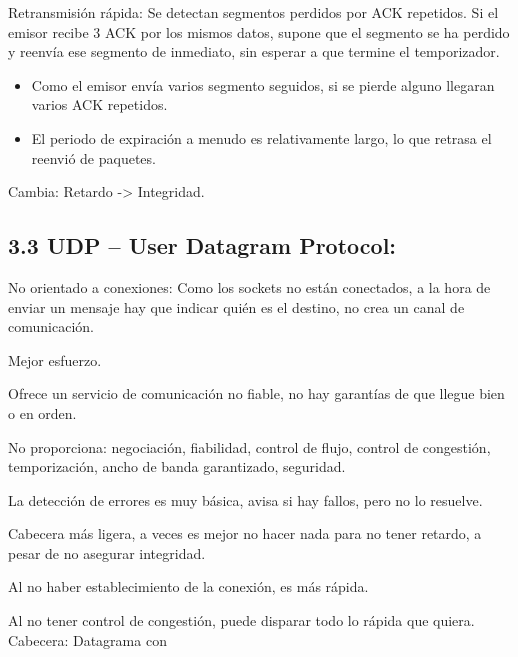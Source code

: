 \documentclass[12pt, twoside, openright]{report} %
\begin{document}
	Retransmisión rápida: Se detectan segmentos perdidos por ACK
    repetidos. Si el emisor recibe 3 ACK por los mismos datos, supone
    que el segmento se ha perdido y reenvía ese segmento de inmediato,
    sin esperar a que termine el temporizador.

    \begin{itemize}
    \item
      Como el emisor envía varios segmento seguidos, si se pierde alguno
      llegaran varios ACK repetidos.
    \item
      El periodo de expiración a menudo es relativamente largo, lo que
      retrasa el reenvió de paquetes.
    \end{itemize}

	Cambia: Retardo -\textgreater{} Integridad.

\subsection{3.3 UDP -- User Datagram Protocol:}


    No orientado a conexiones: Como los sockets no están conectados, a
    la hora de enviar un mensaje hay que indicar quién es el destino, no
    crea un canal de comunicación.

	Mejor esfuerzo.

	Ofrece un servicio de comunicación no fiable, no hay garantías de
    que llegue bien o en orden.

	No proporciona: negociación, fiabilidad, control de flujo, control
    de congestión, temporización, ancho de banda garantizado, seguridad.

	La detección de errores es muy básica, avisa si hay fallos, pero no
    lo resuelve.

	Cabecera más ligera, a veces es mejor no hacer nada para no tener
    retardo, a pesar de no asegurar integridad.

	Al no haber establecimiento de la conexión, es más rápida.

	Al no tener control de congestión, puede disparar todo lo rápida que
    quiera.
\pagebreak
	Cabecera: Datagrama con
\end{document}
